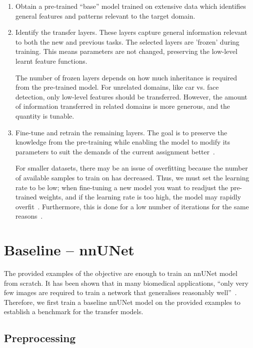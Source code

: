 \documentclass[11pt,twoside]{report}
\begin{document}
\begin{enumerate}
  \item Obtain a pre-trained ``base'' model trained on extensive data which identifies general features and patterns relevant to the target domain.
  
  \item Identify the transfer layers. These layers capture general information relevant to both the new and previous tasks. The selected layers are 'frozen' during training. This means parameters are not changed, preserving the low-level learnt feature functions. 
  
  The number of frozen layers depends on how much inheritance is required from the pre-trained model. For unrelated domains, like car vs. face detection, only low-level features should be transferred. However, the amount of information transferred in related domains is more generous, and the quantity is tunable.
  
  \item Fine-tune and retrain the remaining layers. The goal is to preserve the knowledge from the pre-training while enabling the model to modify its parameters to suit the demands of the current assignment better~\cite{geeks-transfer-learning}.
  
  For smaller datasets, there may be an issue of overfitting because the number of available samples to train on has decreased. Thus, we must set the learning rate to be low; when fine-tuning a new model you want to readjust the pre-trained weights, and if the learning rate is too high, the model may rapidly overfit~\cite{geeks-transfer-learning}. Furthermore, this is done for a low number of iterations for the same reasons~\cite{deep-learning-book}.
\end{enumerate}

\section{Baseline -- nnUNet}

The provided examples of the objective are enough to train an nnUNet model from scratch. It has been shown that in many biomedical applications, ``only very few images are required to train a network that generalises reasonably well''~\cite{DBLP:journals/corr/CicekALBR16}. Therefore, we first train a baseline nnUNet model on the provided examples to establish a benchmark for the transfer models.

\subsection{Preprocessing}\label{sec:nnunet-preprocessing}
\end{document}
